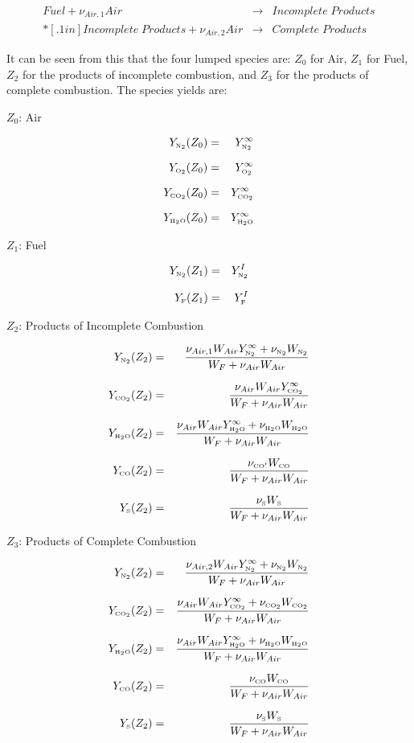 \begin{eqnarray}
Fuel + \nu_{Air,1} Air &\rightarrow&  Incomplete \; Products\\*[.1in]
Incomplete \; Products + \nu_{Air,2} Air &\rightarrow&  Complete \; Products
\label{4lumped}
\end{eqnarray}

It can be seen from this that the four lumped species are: $Z_0$ for Air, $Z_1$ for Fuel, $Z_2$ for the products of incomplete combustion, and $Z_3$ for the products of complete combustion.  The species yields are:

$Z_0$: Air

\begin{eqnarray}
Y_{{\tiny \hbox{N}_2}}(Z_0) & = & Y_{\tiny \hbox{N}_2}^\infty\\*[.1in]
Y_{{\tiny \hbox{O}_2}}(Z_0) & = & Y_{\tiny \hbox{O}_2}^\infty\\*[.1in]
Y_{{\tiny \hbox{CO}_2}}(Z_0) & = & Y_{\tiny \hbox{CO}_2}^\infty\\*[.1in]
Y_{{\tiny \hbox{H}_2\hbox{O}}}(Z_0) & = & Y_{\tiny \hbox{H}_2\hbox{O}}^\infty
\end{eqnarray}

$Z_1$: Fuel

\begin{eqnarray}
Y_{{\tiny \hbox{N}_2}}(Z_1) & = & Y_{\tiny \hbox{N}_2}^I\\*[.1in]
Y_{{\tiny \hbox{F}}}(Z_1) & = & Y_{\tiny \hbox{F}}^I
\end{eqnarray}

$Z_2$: Products of Incomplete Combustion

\begin{eqnarray}
Y_{{\tiny \hbox{N}_2}}(Z_2) & = & \frac{\nu_{Air,1} W_{Air} Y_{\tiny \hbox{N}_2}^\infty +\nu_{{\tiny \hbox{N}_2}} W_{{\tiny \hbox{N}_2}}}{W_F + \nu_{Air} W_{Air}}\\*[.1in]
Y_{{\tiny \hbox{CO}_2}}(Z_2) & = & \frac{\nu_{Air} W_{Air} Y_{\tiny \hbox{CO}_2}^\infty}{W_F + \nu_{Air} W_{Air}} \\*[.1in]
Y_{{\tiny \hbox{H}_2\hbox{O}}}(Z_2) & = & \frac{\nu_{Air} W_{Air}  Y_{\tiny \hbox{H}_2\hbox{O}}^\infty +\nu_{{\tiny \hbox{H}_2\hbox{O}}} W_{{\tiny \hbox{H}_2\hbox{O}}}}{W_F + \nu_{Air} W_{Air}}\\*[.1in]
Y_{{\tiny \hbox{CO}}}(Z_2) & = & \frac{\nu_{{\tiny \hbox{CO}}'} W_{{\tiny \hbox{CO}}}}{W_F + \nu_{Air} W_{Air}}\\*[.1in]
Y_{{\tiny \hbox{S}}}(Z_2) & = & \frac{\nu_{{\tiny \hbox{S}}} W_{{\tiny \hbox{S}}}}{W_F + \nu_{Air} W_{Air}}
\end{eqnarray}

$Z_3$: Products of Complete Combustion

\begin{eqnarray}
Y_{{\tiny \hbox{N}_2}}(Z_2) & = & \frac{\nu_{Air,2} W_{Air}  Y_{\tiny \hbox{N}_2}^\infty +\nu_{{\tiny \hbox{N}_2}} W_{{\tiny \hbox{N}_2}}}{W_F + \nu_{Air} W_{Air}}\\*[.1in]
Y_{{\tiny \hbox{CO}_2}}(Z_2) & = & \frac{\nu_{Air} W_{Air}  Y_{\tiny \hbox{CO}_2}^\infty +\nu_{{\tiny \hbox{CO}_2}} W_{{\tiny \hbox{CO}_2}}}{W_F + \nu_{Air} W_{Air}}\\*[.1in]
Y_{{\tiny \hbox{H}_2\hbox{O}}}(Z_2) & = & \frac{\nu_{Air} W_{Air}  Y_{\tiny \hbox{H}_2\hbox{O}}^\infty +\nu_{{\tiny \hbox{H}_2\hbox{O}}} W_{{\tiny \hbox{H}_2\hbox{O}}}}{W_F + \nu_{Air} W_{Air}}\\*[.1in]
Y_{{\tiny \hbox{CO}}}(Z_2) & = & \frac{\nu_{\tiny \hbox{CO}} W_{{\tiny \hbox{CO}}}}{W_F + \nu_{Air} W_{Air}}\\*[.1in]
Y_{{\tiny \hbox{S}}}(Z_2) & = & \frac{\nu_{{\tiny \hbox{S}}} W_{{\tiny \hbox{S}}}}{W_F + \nu_{Air} W_{Air}}
\end{eqnarray}


